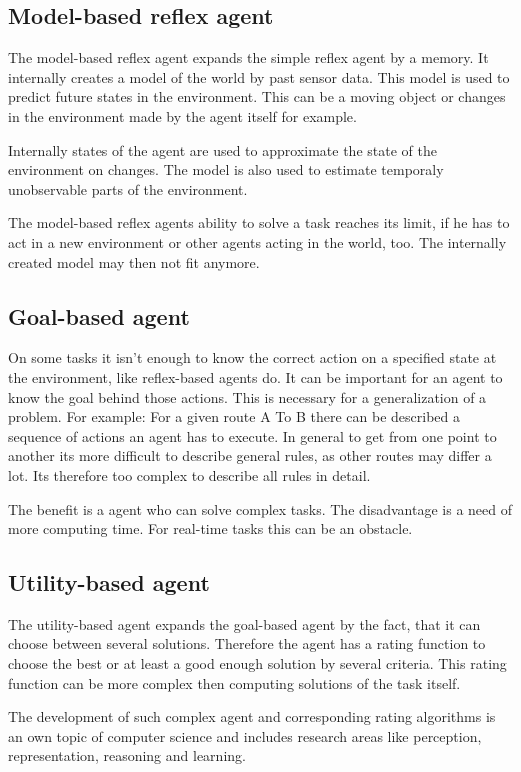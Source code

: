 \documentclass[10pt,a4paper,DIV=11]{scrreprt}
\begin{document}
\subsection{Model-based reflex agent}
The model-based reflex agent expands the simple reflex agent by a memory. It internally creates a model of the world by past sensor data.
This model is used to predict future states in the environment.
This can be a moving object or changes in the environment made by the agent itself for example.

Internally states of the agent are used to approximate the state of the environment on changes. 
The model is also used to estimate temporaly unobservable parts of the environment.

The model-based reflex agents ability to solve a task reaches its limit, if he has to act in a new environment or other agents acting in the world, too. The internally created model may then not fit anymore.


\subsection{Goal-based agent}
On some tasks it isn't enough to know the correct action on a specified state at the environment, like reflex-based agents do. It can be important for an agent to know the goal behind those actions. This is necessary for a generalization of a problem. For example: For a given route A To B there can be described a sequence of actions an agent has to execute. In general to get from one point to another its more difficult to describe general rules, as other routes may differ a lot. Its therefore too complex to describe all rules in detail. 

The benefit is a agent who can solve complex tasks. The disadvantage is a need of more computing time. For real-time tasks this can be an obstacle.

\subsection{Utility-based agent}
The utility-based agent expands the goal-based agent by the fact, that it can choose between several solutions. Therefore the agent has a rating function to choose the best or at least a good enough solution by several criteria. This rating function can be more complex then computing solutions of the task itself.

The development of such complex agent and corresponding rating algorithms is an own topic of computer science and includes research areas like perception, representation, reasoning and learning.
\end{document}
